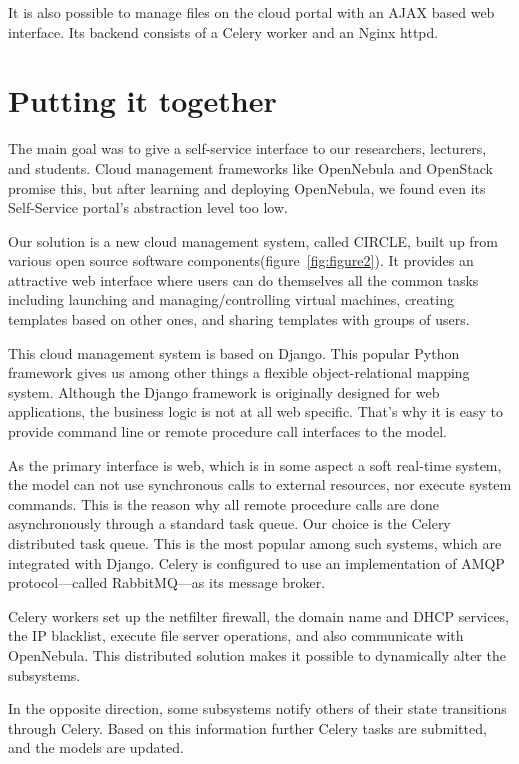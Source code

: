 \documentclass{llncs}
\begin{document}
It is also possible to manage files on the cloud portal with an AJAX based web interface. Its backend consists of a Celery worker and an Nginx httpd.

\section{Putting it together}
The main goal was to give a self-service interface to our researchers, lecturers, and students.
Cloud management frameworks like OpenNebula and OpenStack promise this, but after learning and deploying OpenNebula, we found even its Self-Service portal's abstraction level too low.

Our solution is a new cloud management system, called CIRCLE, built up from various open source software components(figure~\ref{fig:figure2}). It provides an attractive web interface where users can do themselves all the common tasks including launching and managing/controlling virtual machines, creating templates based on other ones, and sharing templates with groups of users.

This cloud management system is based on Django\cite{holovaty2009definitive}. This popular Python framework gives us among other things a flexible object-relational mapping system. Although the Django framework is originally designed for web applications, the business logic is not at all web specific. That's why it is easy to provide command line or remote procedure call interfaces to the model.

As the primary interface is web, which is in some aspect a soft real-time system, the model can not use synchronous calls to external resources, nor execute system commands. This is the reason why all remote procedure calls are done asynchronously through a standard task queue. Our choice is the Celery distributed task queue. This is the most popular among such systems, which are integrated with Django. Celery is configured to use an implementation of AMQP\cite{vinoski2006advanced} protocol---called RabbitMQ---as its message broker.

Celery workers set up the netfilter firewall, the domain name and DHCP services, the IP blacklist, execute file server operations, and also communicate with OpenNebula. This distributed solution makes it possible to dynamically alter the subsystems.

In the opposite direction, some subsystems notify others of their state transitions through Celery. Based on this information further Celery tasks are submitted, and the models are updated.
\end{document}
